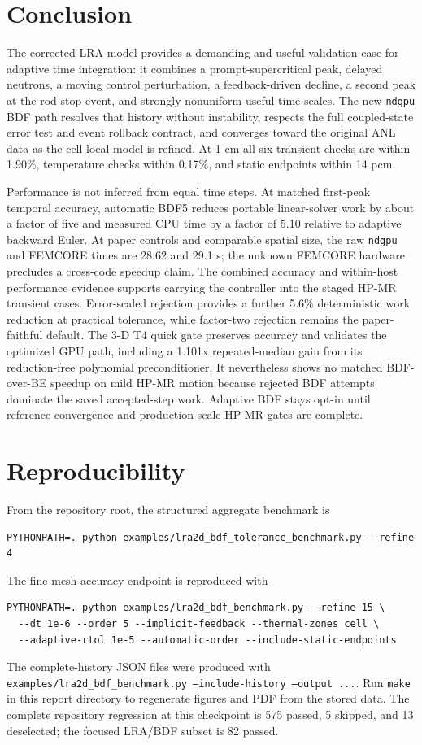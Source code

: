\documentclass[10pt]{article}
\newcommand{\ndgpu}{\texttt{ndgpu}}
\newcommand{\code}[1]{\texttt{#1}}
\begin{document}
\section{Conclusion}

The corrected LRA model provides a demanding and useful validation case for
adaptive time integration: it combines a prompt-supercritical peak, delayed
neutrons, a moving control perturbation, a feedback-driven decline, a second
peak at the rod-stop event, and strongly nonuniform useful time scales. The new
\ndgpu{} BDF path resolves that history without instability, respects the full
coupled-state error test and event rollback contract, and converges toward the
original ANL data as the cell-local model is refined. At 1 cm all six transient
checks are within 1.90\%, temperature checks within 0.17\%, and static endpoints
within 14 pcm.

Performance is not inferred from equal time steps. At matched first-peak
temporal accuracy, automatic BDF5 reduces portable linear-solver work by about
a factor of five and measured CPU time by a factor of 5.10 relative to adaptive
backward Euler. At paper controls and comparable spatial size, the raw \ndgpu{}
and FEMCORE times are 28.62 and 29.1 s; the unknown FEMCORE hardware precludes
a cross-code speedup claim. The combined accuracy and within-host performance
evidence supports carrying the controller into the staged HP-MR transient
cases. Error-scaled rejection provides a further 5.6\% deterministic work
reduction at practical tolerance, while factor-two rejection remains the
paper-faithful default. The 3-D T4 quick gate preserves accuracy and validates
the optimized GPU path, including a 1.101x repeated-median gain from its
reduction-free polynomial preconditioner. It nevertheless shows no matched
BDF-over-BE speedup on mild HP-MR motion because rejected BDF attempts dominate
the saved accepted-step work. Adaptive BDF stays opt-in until reference
convergence and production-scale HP-MR gates are complete.

\section*{Reproducibility}

From the repository root, the structured aggregate benchmark is
\begin{verbatim}
PYTHONPATH=. python examples/lra2d_bdf_tolerance_benchmark.py --refine 4
\end{verbatim}
The fine-mesh accuracy endpoint is reproduced with
\begin{verbatim}
PYTHONPATH=. python examples/lra2d_bdf_benchmark.py --refine 15 \
  --dt 1e-6 --order 5 --implicit-feedback --thermal-zones cell \
  --adaptive-rtol 1e-5 --automatic-order --include-static-endpoints
\end{verbatim}
The complete-history JSON files were produced with
\code{examples/lra2d\_bdf\_benchmark.py --include-history --output ...}.
Run \code{make} in this report directory to regenerate figures and PDF from
the stored data. The complete repository regression at this checkpoint is 575
passed, 5 skipped, and 13 deselected; the focused LRA/BDF subset is 82 passed.
\end{document}
